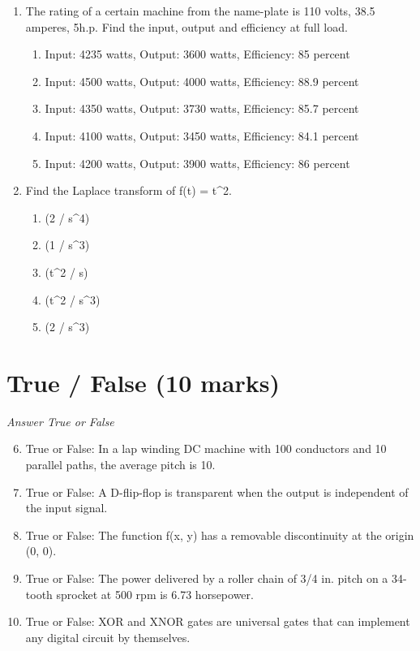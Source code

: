 \documentclass[12pt]{article}
\begin{document}
\begin{enumerate}[label=\arabic*.]
\begin{enumerate}[label=(\alph*)]
    \item i\_forced= 15cos1000t - 30 sin 1000tmA
\end{enumerate}
\item The rating of a certain machine from the name-plate is 110 volts, 38.5 amperes, 5h.p. Find
the input, output and efficiency at full load.
\begin{enumerate}[label=(\alph*)]
    \item Input: 4235 watts, Output: 3600 watts, Efficiency: 85 percent
    \item Input: 4500 watts, Output: 4000 watts, Efficiency: 88.9 percent
    \item Input: 4350 watts, Output: 3730 watts, Efficiency: 85.7 percent
    \item Input: 4100 watts, Output: 3450 watts, Efficiency: 84.1 percent
    \item Input: 4200 watts, Output: 3900 watts, Efficiency: 86 percent
\end{enumerate}
\item Find the Laplace transform of f(t) = t\^{}2.
\begin{enumerate}[label=(\alph*)]
    \item (2 / s\^{}4)
    \item (1 / s\^{}3)
    \item (t\^{}2 / s)
    \item (t\^{}2 / s\^{}3)
    \item (2 / s\^{}3)
\end{enumerate}
\end{enumerate}

\section*{True / False (10 marks)}
\textit{Answer True or False}
\begin{enumerate}[label=\arabic*.]
\setcounter{enumi}{5}
\item True or False: In a lap winding DC machine with 100 conductors and 10 parallel paths, the average pitch is 10.
\item True or False: A D-flip-flop is transparent when the output is independent of the input signal.
\item True or False: The function f(x, y) has a removable discontinuity at the origin (0, 0).
\item True or False: The power delivered by a roller chain of 3/4 in. pitch on a 34-tooth sprocket at 500 rpm is 6.73 horsepower.
\item True or False: XOR and XNOR gates are universal gates that can implement any digital circuit by themselves.
\end{enumerate}
\end{document}
